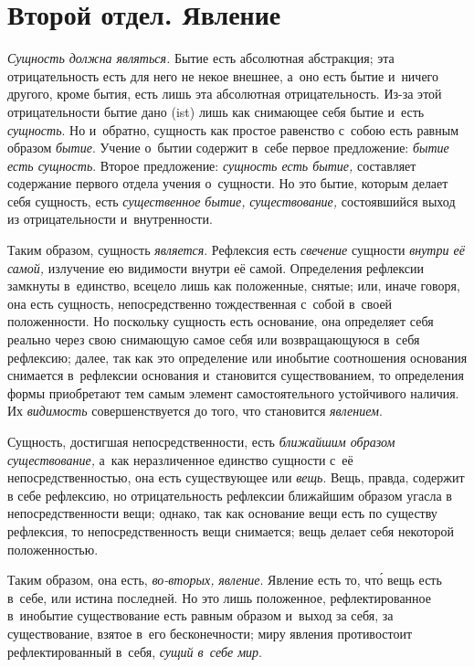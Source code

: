 \part[{\em Второй отдел} Явление]{Второй отдел. Явление}

{\em Сущность должна являться.}
Бытие есть абсолютная абстракция; эта отрицательность есть для него не некое
внешнее, а~оно есть бытие и~ничего другого, кроме бытия, есть лишь эта
абсолютная отрицательность. Из-за этой отрицательности бытие дано (ist)
лишь как снимающее себя бытие и~есть {\em сущность}. Но
и~обратно, сущность как простое равенство с~собою есть равным образом
{\em бытие}. Учение о~бытии содержит в~себе первое
предложение: {\em бытие есть сущность}. Второе
предложение: {\em сущность есть бытие,} составляет
содержание первого отдела учения о~сущности. Но это бытие, которым делает
себя сущность, есть {\em существенное бытие,}
{\em существование,} состоявшийся выход из
отрицательности и~внутренности.

Таким образом, сущность {\em является}. Рефлексия есть
{\em свечение} сущности {\em внутри
её самой,} излучение ею видимости внутри её самой. Определения рефлексии
замкнуты в~единство, всецело лишь как положенные, снятые; или, иначе
говоря, она есть сущность, непосредственно тождественная с~собой в~своей
положенности. Но поскольку сущность есть основание, она определяет себя
реально через свою снимающую самое себя или возвращающуюся в~себя
рефлексию; далее, так как это определение или инобытие соотношения
основания снимается в~рефлексии основания и~становится существованием, то
определения формы приобретают тем самым элемент самостоятельного
устойчивого наличия. Их {\em видимость}
совершенствуется до того, что становится {\em явлением}.

Сущность, достигшая непосредственности, есть
{\em ближайшим образом существование,} а~как
неразличенное единство сущности с~её непосредственностью, она есть
существующее или {\em вещь}. Вещь, правда, содержит в
себе рефлексию, но отрицательность рефлексии ближайшим образом угасла в
непосредственности вещи; однако, так как основание вещи есть по существу
рефлексия, то непосредственность вещи снимается; вещь делает себя некоторой
положенностью.

Таким образом, она есть, {\em во-вторых,}
{\em явление}. Явление есть то, чт\'{о} вещь есть в~себе,
или истина последней. Но это лишь положенное, рефлектированное в~инобытие
существование есть равным образом и~выход за себя, за существование, взятое
в~его бесконечности; миру явления противостоит рефлектированный в~себя,
{\em сущий в~себе мир}.

